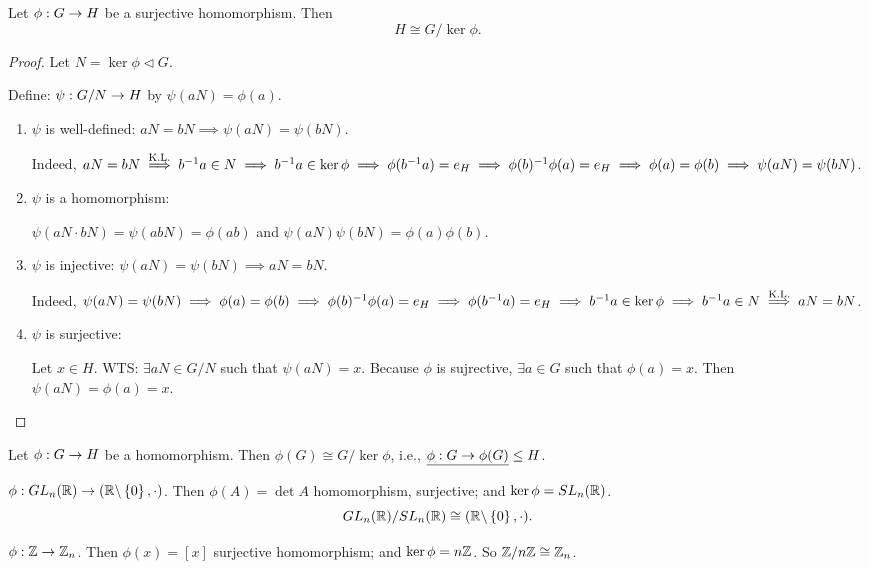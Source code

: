 \documentclass[]{article}
\begin{document}
\begin{theorem}
	 Let $\phi:G\rightarrow H$ be a surjective homomorphism. Then $$H\cong G/\ker\phi.$$
\end{theorem}
\begin{proof}
	Let $N = \ker\phi\triangleleft G$.
	Define: $\psi: G/N\rightarrow H$ by $\psi(aN)=\phi(a)$.
	\begin{enumerate}
		\item $\psi$ is well-defined:
			$aN=bN\implies\psi(aN)=\psi(bN)$.

			Indeed, $aN=bN \overset{\text{K.L.}}{\implies}b^{-1} a\in N \implies b^{-1} a\in \ker\phi \implies \phi(b^{-1} a)=e_H \implies \phi(b)^{-1}\phi(a)=e_H \implies \phi(a)=\phi(b) \implies \psi(aN)=\psi(bN)$.
		
		\item $\psi$ is a homomorphism:

			$\psi(aN\cdot bN) = \psi(abN) = \phi(ab)$ and $\psi(aN)\psi(bN) = \phi(a)\phi(b)$.

		\item $\psi$ is injective:
			$\psi(aN)=\psi(bN) \implies aN=bN$.

			Indeed, $\psi(aN) = \psi(bN) \implies \phi(a)=\phi(b) \implies \phi(b)^{-1}\phi(a) = e_H \implies \phi(b^{-1} a) = e_H \implies b^{-1} a\in\ker\phi \implies b^{-1} a\in N \overset{\text{K.L.}}{\implies} aN=bN$.

		\item $\psi$ is surjective:

			Let $x\in H$. WTS: $\exists aN\in G/N$ such that $\psi(aN) = x$.
			Because $\phi$ is sujrective, $\exists a\in G$ such that $\phi(a) = x$.
			Then $\psi(aN)=\phi(a)=x$.
	\end{enumerate}
\end{proof}
\begin{corollary}
	Let $\phi:G\rightarrow H$ be a homomorphism. Then $\phi(G)\cong G/\ker\phi$, i.e., $\underline{\phi:G\rightarrow\phi(G)}\leq H$.
\end{corollary}
\begin{example}
	$\phi:GL_n(\mathbb{R})\rightarrow (\mathbb{R}\backslash\left\{ 0 \right\},\cdot)$.
	Then $\phi(A) = \det A$ homomorphism, surjective; and $\ker\phi=SL_n(\mathbb{R})$.
	$$GL_n(\mathbb{R})/SL_n(\mathbb{R})\cong(\mathbb{R}\backslash\left\{ 0 \right\},\cdot).$$
\end{example}
\begin{example}
	$\phi:\mathbb{Z}\rightarrow\mathbb{Z}_n$.
	Then $\phi(x)=[x]$ surjective homomorphism; and $\ker\phi=n\mathbb{Z}$.
	So $\mathbb{Z}/n\mathbb{Z}\cong\mathbb{Z}_n$.
\end{example}
\end{document}
